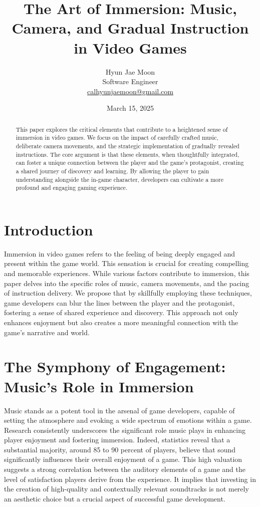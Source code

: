 \documentclass{article}
\title{The Art of Immersion: Music, Camera, and Gradual Instruction in Video Games}
\author{Hyun Jae Moon \\ \small Software Engineer \\ \small \href{mailto:calhyunjaemoon@gmail.com}{calhyunjaemoon@gmail.com}}
\date{March 15, 2025}
\begin{document}
 \maketitle

 \begin{abstract}
 This paper explores the critical elements that contribute to a heightened sense of immersion in video games. We focus on the impact of carefully crafted music, deliberate camera movements, and the strategic implementation of gradually revealed instructions. The core argument is that these elements, when thoughtfully integrated, can foster a unique connection between the player and the game's protagonist, creating a shared journey of discovery and learning. By allowing the player to gain understanding alongside the in-game character, developers can cultivate a more profound and engaging gaming experience.
 \end{abstract}

    \section{Introduction}

    Immersion in video games refers to the feeling of being deeply engaged and present within the game world. This sensation is crucial for creating compelling and memorable experiences. While various factors contribute to immersion, this paper delves into the specific roles of music, camera movements, and the pacing of instruction delivery. We propose that by skillfully employing these techniques, game developers can blur the lines between the player and the protagonist, fostering a sense of shared experience and discovery. This approach not only enhances enjoyment but also creates a more meaningful connection with the game's narrative and world.

    \section{The Symphony of Engagement: Music's Role in Immersion}

    Music stands as a potent tool in the arsenal of game developers, capable of setting the atmosphere and evoking a wide spectrum of emotions within a game. Research consistently underscores the significant role music plays in enhancing player enjoyment and fostering immersion. Indeed, statistics reveal that a substantial majority, around 85 to 90 percent of players, believe that sound significantly influences their overall enjoyment of a game. This high valuation suggests a strong correlation between the auditory elements of a game and the level of satisfaction players derive from the experience. It implies that investing in the creation of high-quality and contextually relevant soundtracks is not merely an aesthetic choice but a crucial aspect of successful game development.
\end{document}
